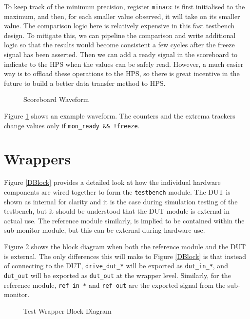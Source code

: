 To keep track of the minimum precision, register \texttt{minacc} is first initialised to the maximum, and then, for each smaller value observed, it will take on its smaller value.
The comparison logic here is relatively expensive in this fast testbench design.
To mitigate this, we can pipeline the comparison and write additional logic so that the results would become consistent a few cycles after the freeze signal has been asserted.
Then we can add a ready signal in the scoreboard to indicate to the HPS when the values can be safely read.
However, a much easier way is to offload these operations to the HPS, so there is great incentive in the future to build a better data transfer method to HPS.

\begin{figure}[H]
  \centering
  
  \caption{Scoreboard Waveform}
  \label{ScoreboardWave}
\end{figure}

Figure \ref{ScoreboardWave} shows an example waveform.
The counters and the extrema trackers change values only if \texttt{mon\_ready \&\& !freeze}.

\section{Wrappers}

Figure \ref{DBlock} provides a detailed look at how the individual hardware components are wired together to form the \texttt{testbench} module.
The DUT is shown as internal for clarity and it is the case during simulation testing of the testbench, but it should be understood that the DUT module is external in actual use.
The reference module similarly, is implied to be contained within the sub-monitor module, but this can be external during hardware use.

Figure \ref{WrapperBlk} shows the block diagram when both the reference module and the DUT is external.
The only differences this will make to Figure \ref{DBlock} is that instead of connecting to the DUT, \texttt{drive\_dut\_*} will be exported as \texttt{dut\_in\_*}, and \texttt{dut\_out} will be exported as \texttt{dut\_out} at the wrapper level.
Similarly, for the reference module, \texttt{ref\_in\_*} and \texttt{ref\_out} are the exported signal from the sub-monitor.

\begin{figure}[H]
  \centering
  
  \caption{Test Wrapper Block Diagram}
  \label{WrapperBlk}
\end{figure}

